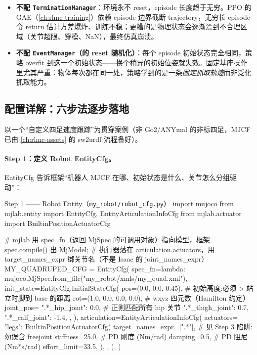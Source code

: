 \begin{itemize}
\item \textbf{不配 \texttt{TerminationManager}}：环境永不 reset，episode 长度趋于无穷。PPO 的 GAE（\cref{ch:rlmc-training}）依赖 episode 边界截断 trajectory，无穷长 episode 令 return 估计方差爆炸、训练不稳；更糟的是物理状态会逐渐漂到不合理区域（关节超限、穿模、NaN），最终仿真崩溃。
\item \textbf{不配 \texttt{EventManager}（的 reset 随机化）}：每个 episode 初始状态完全相同，策略 overfit 到这一个初始状态——换个稍异的初始位姿就失效。固定基座操作里尤其严重：物体每次都在同一处，策略学到的是一条\emph{固定抓取轨迹}而非泛化抓取能力。
\end{itemize}

\subsection{配置详解：六步法逐步落地}
\label{sec:rlmc-diy-mjlab-sixstep}

以一个“自定义四足速度跟踪”为贯穿案例（非 Go2/ANYmal 的非标四足，MJCF 已由 \cref{ch:rlmc-assets} 的 sw2urdf 流程备好）。

\paragraph{Step 1：定义 Robot EntityCfg。}EntityCfg 告诉框架“机器人 MJCF 在哪、初始状态是什么、关节怎么分组驱动”：

\begin{codebox}[Python]{Step 1 —— Robot Entity（\texttt{my\_robot/\allowbreak robot\_cfg.\allowbreak py}）}
import mujoco
from mjlab.entity import EntityCfg, EntityArticulationInfoCfg
from mjlab.actuator import BuiltinPositionActuatorCfg

# mjlab 用 spec_fn（返回 MjSpec 的可调用对象）指向模型，框架 spec.compile() 出 MjModel;
# 执行器落在 articulation.actuators，用 target_names_expr 绑关节名（不是 Isaac 的 joint_names_expr）
MY_QUADRUPED_CFG = EntityCfg(
    spec_fn=lambda: mujoco.MjSpec.from_file("my_robot/xmls/my_quad.xml"),
    init_state=EntityCfg.InitialStateCfg(
        pos=(0.0, 0.0, 0.45),                 # 初始高度:必须 > 站立时脚到 base 的距离
        rot=(1.0, 0.0, 0.0, 0.0),             # wxyz 四元数（Hamilton 约定）
        joint_pos={
            ".*_hip_joint":   0.0,            # 正则匹配所有 hip 关节
            ".*_thigh_joint": 0.7,
            ".*_calf_joint":  -1.4,
        },
    ),
    articulation=EntityArticulationInfoCfg(
        actuators={
            "legs": BuiltinPositionActuatorCfg(
                target_names_expr=[".*"],     # 见 Step 3 陷阱:勿误含 freejoint
                stiffness=25.0,               # PD 刚度 (Nm/rad)
                damping=0.5,                  # PD 阻尼 (Nm*s/rad)
                effort_limit=33.5,
            ),
        },
    ),
)
\end{codebox}


